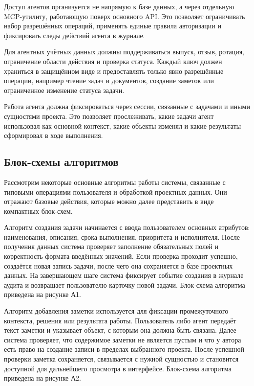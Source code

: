 Доступ агентов организуется не напрямую к базе данных, а через отдельную MCP-утилиту, работающую поверх основного API. Это позволяет ограничивать набор разрешённых операций, применять единые правила авторизации и фиксировать следы действий агента в журнале.

Для агентных учётных данных должны поддерживаться выпуск, отзыв, ротация, ограничение области действия и проверка статуса. Каждый ключ должен храниться в защищённом виде и предоставлять только явно разрешённые операции, например чтение задач и документов, создание заметок или ограниченное изменение статуса задачи.

Работа агента должна фиксироваться через сессии, связанные с задачами и иными сущностями проекта. Это позволяет прослеживать, какие задачи агент использовал как основной контекст, какие объекты изменял и какие результаты сформировал в ходе выполнения.

\textheadingsep
\subsection{Блок-схемы алгоритмов}

\headingtextsep

Рассмотрим некоторые основные алгоритмы работы системы, связанные с типовыми операциями пользователя и обработкой проектных данных. Они отражают базовые действия, которые можно далее представить в виде компактных блок-схем.


Алгоритм создания задачи начинается с ввода пользователем основных атрибутов: наименования, описания, срока выполнения, приоритета и исполнителя. После получения данных система проверяет заполнение обязательных полей и корректность формата введённых значений. Если проверка проходит успешно, создаётся новая запись задачи, после чего она сохраняется в базе проектных данных. На завершающем шаге система фиксирует событие создания в журнале аудита и возвращает пользователю карточку новой задачи. Блок-схема алгоритма приведена на рисунке А1.


Алгоритм добавления заметки используется для фиксации промежуточного контекста, решения или результата работы. Пользователь либо агент передаёт текст заметки и указывает объект, с которым она должна быть связана. Далее система проверяет, что содержимое заметки не является пустым и что у автора есть право на создание записи в пределах выбранного проекта. После успешной проверки заметка сохраняется, связывается с нужной сущностью и становится доступной для дальнейшего просмотра в интерфейсе. Блок-схема алгоритма приведена на рисунке А2.

